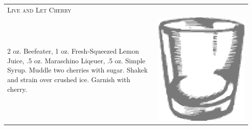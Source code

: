 \documentclass{article}
\begin{document}
\begin{multicols}{2}
\begin{tabular}{p{2in} p{0.5in}}
\multicolumn{2}{p{3in}}{\centering\Huge\textsc{Live and Let Cherry}} \\ 
   \vspace{-0.1in}2 oz. Beefeater, 1 oz. Fresh-Squeezed Lemon Juice, .5 oz. Maraschino Liqeuer, .5 oz. Simple Syrup. Muddle two cherries with sugar. Shakek and strain over crushed ice. Garnish with cherry. &
   \vspace{-0.1in} \includegraphics{rocks_glass.png}
\end{tabular}


\end{multicols}
\end{document}
